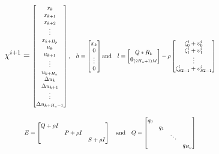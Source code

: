 \begin{equation}
\chi^{i+1}=
\scalemath{0.7}{
\begin{bmatrix}
  x_k\\
	x_{k+1}\\
	x_{k+2}\\
   \vdots\\
	x_{k+H_p}\\
u_{k}\\
u_{k+1}\\
\vdots\\
u_{k+H_u}\\
\Delta u_{k}\\
\Delta u_{k+1}\\
\vdots\\
\Delta u_{k+H_u-1}
\end{bmatrix}
\label{eq:omega}
\text{,}\quad
h=
\begin{bmatrix}
x_{k}\\
0\\
\vdots\\
0
\end{bmatrix}
\text{and}\quad
l=
\begin{bmatrix}
	Q*R_k\\
	\textbf{0}_{(2H_u+1)M}
\end{bmatrix}-
\rho \begin{bmatrix}
\zeta_0^i+\upsilon_0^i\\
\zeta_1^i+\upsilon_1^i\\
\vdots\\
\zeta_{S2-1}^i+\upsilon_{S2-1}^i
\end{bmatrix}}
\end{equation}

\begin{equation}
\scalemath{0.7}{
E=
\begin{bmatrix}
Q+\rho I& & \\
 &P+\rho I& \\
& &S+\rho I 
\end{bmatrix}
\quad\text{and}\quad
Q=
\begin{bmatrix}
q_0&&&\\
&q_1&&\\
&&\ddots&\\
&&&q_{H_p} 
\end{bmatrix}}
\label{eq:costconst}
\end{equation}

